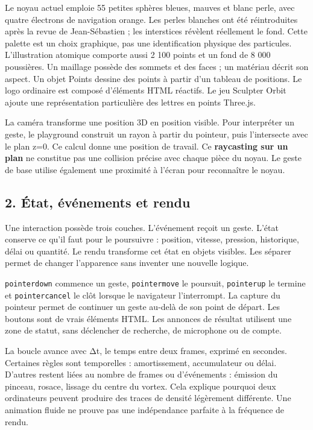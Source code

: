 \documentclass[
  canadien,
  11pt,
  letterpaper,
]{article}
\begin{document}
Le noyau actuel emploie 55 petites sphères bleues, mauves et blanc
perle, avec quatre électrons de navigation orange. Les perles blanches
ont été réintroduites après la revue de Jean-Sébastien ; les interstices
révèlent réellement le fond. Cette palette est un choix graphique, pas
une identification physique des particules. L'illustration atomique
comporte aussi 2 100 points et un fond de 8 000 poussières. Un maillage
possède des sommets et des faces ; un matériau décrit son aspect. Un
objet Points dessine des points à partir d'un tableau de positions. Le
logo ordinaire est composé d'éléments HTML réactifs. Le jeu Sculpter
Orbit ajoute une représentation particulière des lettres en points
Three.js.

La caméra transforme une position 3D en position visible. Pour
interpréter un geste, le playground construit un rayon à partir du
pointeur, puis l'intersecte avec le plan z=0. Ce calcul donne une
position de travail. Ce \textbf{raycasting sur un plan} ne constitue pas
une collision précise avec chaque pièce du noyau. Le geste de base
utilise également une proximité à l'écran pour reconnaître le noyau.

\subsection{2. État, événements et
rendu}\label{uxe9tat-uxe9vuxe9nements-et-rendu}

Une interaction possède trois couches. L'événement reçoit un geste.
L'état conserve ce qu'il faut pour le poursuivre : position, vitesse,
pression, historique, délai ou quantité. Le rendu transforme cet état en
objets visibles. Les séparer permet de changer l'apparence sans inventer
une nouvelle logique.

\texttt{pointerdown} commence un geste, \texttt{pointermove} le
poursuit, \texttt{pointerup} le termine et \texttt{pointercancel} le
clôt lorsque le navigateur l'interrompt. La capture du pointeur permet
de continuer un geste au-delà de son point de départ. Les boutons sont
de vrais éléments HTML. Les annonces de résultat utilisent une zone de
statut, sans déclencher de recherche, de microphone ou de compte.

La boucle avance avec Δt, le temps entre deux frames, exprimé en
secondes. Certaines règles sont temporelles : amortissement,
accumulateur ou délai. D'autres restent liées au nombre de frames ou
d'événements : émission du pinceau, rosace, lissage du centre du vortex.
Cela explique pourquoi deux ordinateurs peuvent produire des traces de
densité légèrement différente. Une animation fluide ne prouve pas une
indépendance parfaite à la fréquence de rendu.
\end{document}
